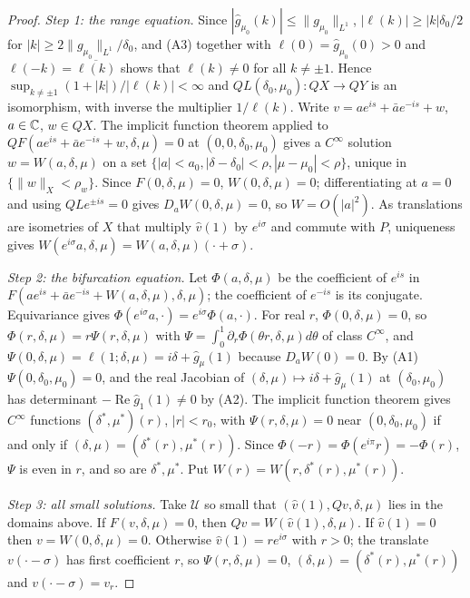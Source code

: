 \documentclass[11pt,a4paper]{report}
\newcommand{\gh}{\hat g}
\begin{document}
\begin{proof}
\emph{Step 1: the range equation.} Since $|\gh_{\mu_0}(k)|\le\|g_{\mu_0}\|_{L^1}$, $|\ell(k)|\ge|k|\delta_0/2$ for $|k|\ge2\|g_{\mu_0}\|_{L^1}/\delta_0$, and (A3) together with $\ell(0)=\gh_{\mu_0}(0)>0$ and $\ell(-k)=\overline{\ell(k)}$ shows that $\ell(k)\ne0$ for all $k\ne\pm1$. Hence $\sup_{k\neq\pm1}(1+|k|)/|\ell(k)|<\infty$ and $QL(\delta_0,\mu_0):QX\to QY$ is an isomorphism, with inverse the multiplier $1/\ell(k)$. Write $v=ae^{is}+\bar ae^{-is}+w$, $a\in\mathbb{C}$, $w\in QX$. The implicit function theorem applied to $QF(ae^{is}+\bar ae^{-is}+w,\delta,\mu)=0$ at $(0,0,\delta_0,\mu_0)$ gives a $C^\infty$ solution $w=W(a,\delta,\mu)$ on a set $\{|a|<a_0,|\delta-\delta_0|<\rho,|\mu-\mu_0|<\rho\}$, unique in $\{\|w\|_X<\rho_w\}$. Since $F(0,\delta,\mu)=0$, $W(0,\delta,\mu)=0$; differentiating at $a=0$ and using $QLe^{\pm is}=0$ gives $D_aW(0,\delta,\mu)=0$, so $W=O(|a|^2)$. As translations are isometries of $X$ that multiply $\hat v(1)$ by $e^{i\sigma}$ and commute with $P$, uniqueness gives $W(e^{i\sigma}a,\delta,\mu)=W(a,\delta,\mu)(\cdot+\sigma)$.

\emph{Step 2: the bifurcation equation.} Let $\Phi(a,\delta,\mu)$ be the coefficient of $e^{is}$ in $F(ae^{is}+\bar ae^{-is}+W(a,\delta,\mu),\delta,\mu)$; the coefficient of $e^{-is}$ is its conjugate. Equivariance gives $\Phi(e^{i\sigma}a,\cdot)=e^{i\sigma}\Phi(a,\cdot)$. For real $r$, $\Phi(0,\delta,\mu)=0$, so $\Phi(r,\delta,\mu)=r\Psi(r,\delta,\mu)$ with $\Psi=\int_0^1\partial_r\Phi(\theta r,\delta,\mu)d\theta$ of class $C^\infty$, and $\Psi(0,\delta,\mu)=\ell(1;\delta,\mu)=i\delta+\gh_\mu(1)$ because $D_aW(0)=0$. By (A1) $\Psi(0,\delta_0,\mu_0)=0$, and the real Jacobian of $(\delta,\mu)\mapsto i\delta+\gh_\mu(1)$ at $(\delta_0,\mu_0)$ has determinant $-\operatorname{Re}\gh_1(1)\ne0$ by (A2). The implicit function theorem gives $C^\infty$ functions $(\delta^*,\mu^*)(r)$, $|r|<r_0$, with $\Psi(r,\delta,\mu)=0$ near $(0,\delta_0,\mu_0)$ if and only if $(\delta,\mu)=(\delta^*(r),\mu^*(r))$. Since $\Phi(-r)=\Phi(e^{i\pi}r)=-\Phi(r)$, $\Psi$ is even in $r$, and so are $\delta^*,\mu^*$. Put $W(r)=W(r,\delta^*(r),\mu^*(r))$.

\emph{Step 3: all small solutions.} Take $\mathcal U$ so small that $(\hat v(1),Qv,\delta,\mu)$ lies in the domains above. If $F(v,\delta,\mu)=0$, then $Qv=W(\hat v(1),\delta,\mu)$. If $\hat v(1)=0$ then $v=W(0,\delta,\mu)=0$. Otherwise $\hat v(1)=re^{i\sigma}$ with $r>0$; the translate $v(\cdot-\sigma)$ has first coefficient $r$, so $\Psi(r,\delta,\mu)=0$, $(\delta,\mu)=(\delta^*(r),\mu^*(r))$ and $v(\cdot-\sigma)=v_r$.
\end{proof}
\end{document}
